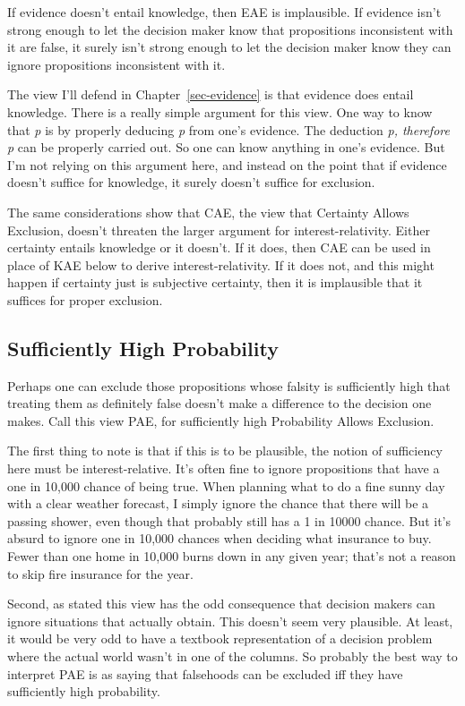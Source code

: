 \documentclass[
  12pt,
  letterpaper,
]{scrbook}
\begin{document}
If evidence doesn't entail knowledge, then EAE is implausible. If
evidence isn't strong enough to let the decision maker know that
propositions inconsistent with it are false, it surely isn't strong
enough to let the decision maker know they can ignore propositions
inconsistent with it.

The view I'll defend in Chapter~\ref{sec-evidence} is that evidence does
entail knowledge. There is a really simple argument for this view. One
way to know that \emph{p} is by properly deducing \emph{p} from one's
evidence. The deduction \emph{p, therefore p} can be properly carried
out. So one can know anything in one's evidence. But I'm not relying on
this argument here, and instead on the point that if evidence doesn't
suffice for knowledge, it surely doesn't suffice for exclusion.

The same considerations show that CAE, the view that Certainty Allows
Exclusion, doesn't threaten the larger argument for interest-relativity.
Either certainty entails knowledge or it doesn't. If it does, then CAE
can be used in place of KAE below to derive interest-relativity. If it
does not, and this might happen if certainty just is subjective
certainty, then it is implausible that it suffices for proper exclusion.

\subsection{Sufficiently High Probability}\label{sec-kae-high-prob}

Perhaps one can exclude those propositions whose falsity is sufficiently
high that treating them as definitely false doesn't make a difference to
the decision one makes. Call this view PAE, for sufficiently high
Probability Allows Exclusion.

The first thing to note is that if this is to be plausible, the notion
of sufficiency here must be interest-relative. It's often fine to ignore
propositions that have a one in 10,000 chance of being true. When
planning what to do a fine sunny day with a clear weather forecast, I
simply ignore the chance that there will be a passing shower, even
though that probably still has a 1 in 10000 chance. But it's absurd to
ignore one in 10,000 chances when deciding what insurance to buy. Fewer
than one home in 10,000 burns down in any given year; that's not a
reason to skip fire insurance for the year.

Second, as stated this view has the odd consequence that decision makers
can ignore situations that actually obtain. This doesn't seem very
plausible. At least, it would be very odd to have a textbook
representation of a decision problem where the actual world wasn't in
one of the columns. So probably the best way to interpret PAE is as
saying that falsehoods can be excluded iff they have sufficiently high
probability.
\end{document}
